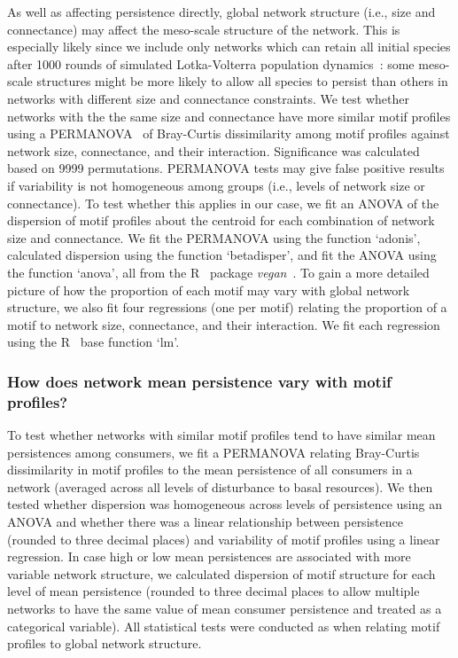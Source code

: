 \documentclass[12pt]{article}
\begin{document}
\begin{spacing}{2.0}
            As well as affecting persistence directly, global network structure (i.e., size and connectance) may affect the meso-scale structure of the network.
            This is especially likely since we include only networks which can retain all initial species after 1000 rounds of simulated Lotka-Volterra population dynamics~\citep{Cirtwill2021_inprep}:  some meso-scale structures might be more likely to allow all species to persist than others in networks with different size and connectance constraints.
            We test whether networks with the the same size and connectance have more similar motif profiles using a PERMANOVA~\citep{Anderson2001} of Bray-Curtis dissimilarity among motif profiles against network size, connectance, and their interaction.
            Significance was calculated based on 9999 permutations.
            PERMANOVA tests may give false positive results if variability is not homogeneous among groups (i.e., levels of network size or connectance).
            To test whether this applies in our case, we fit an ANOVA of the dispersion of motif profiles about the centroid for each combination of network size and connectance. 
            We fit the PERMANOVA using the function `adonis', calculated dispersion using the function `betadisper', and fit the ANOVA using the function `anova', all from the R~\citep{R} package \emph{vegan}~\citep{vegan}.
            To gain a more detailed picture of how the proportion of each motif may vary with global network structure, we also fit four regressions (one per motif) relating the proportion of a motif to network size, connectance, and their interaction.
            We fit each regression using the R~\citep{R} base function `lm'.
            
        
        \subsubsection*{How does network mean persistence vary with motif profiles?}

            To test whether networks with similar motif profiles tend to have similar mean persistences among consumers, we fit a PERMANOVA relating Bray-Curtis dissimilarity in motif profiles to the mean persistence of all consumers in a network (averaged across all levels of disturbance to basal resources).
            We then tested whether dispersion was homogeneous across levels of persistence using an ANOVA and whether there was a linear relationship between persistence (rounded to three decimal places) and variability of motif profiles using a linear regression.
            In case high or low mean persistences are associated with more variable network structure, we calculated dispersion of motif structure for each level of mean persistence (rounded to three decimal places to allow multiple networks to have the same value of mean consumer persistence and treated as a categorical variable). 
            All statistical tests were conducted as when relating motif profiles to global network structure.
            

\end{spacing}
\end{document}
